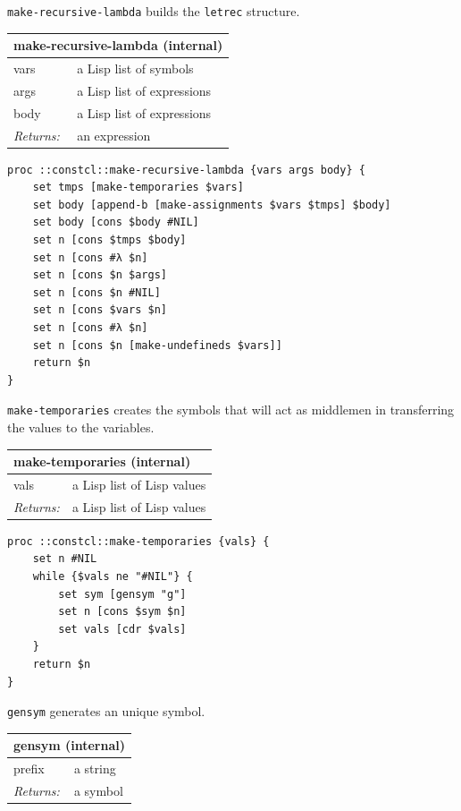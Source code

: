 \documentclass[twoside,9pt]{report}
\begin{document}
\texttt{make-recursive-lambda} builds the \texttt{letrec} structure.

\begin{tabular}{ |l l| }
\hline
\multicolumn{2}{|l|}{make-recursive-lambda (internal)} \\
\hline
vars & a Lisp list of symbols \\
args & a Lisp list of expressions \\
body & a Lisp list of expressions \\
\textit{Returns:} & an expression \\
\hline
\end{tabular}

\noindent\makebox[\linewidth]{\rule{\linewidth}{0.4pt}}
\begin{lstlisting}
proc ::constcl::make-recursive-lambda {vars args body} {
    set tmps [make-temporaries $vars]
    set body [append-b [make-assignments $vars $tmps] $body]
    set body [cons $body #NIL]
    set n [cons $tmps $body]
    set n [cons #λ $n]
    set n [cons $n $args]
    set n [cons $n #NIL]
    set n [cons $vars $n]
    set n [cons #λ $n]
    set n [cons $n [make-undefineds $vars]]
    return $n
}
\end{lstlisting}
\noindent\makebox[\linewidth]{\rule{\linewidth}{0.4pt}}

\texttt{make-temporaries} creates the symbols that will act as middlemen in transferring the values to the variables.

\begin{tabular}{ |l l| }
\hline
\multicolumn{2}{|l|}{make-temporaries (internal)} \\
\hline
vals & a Lisp list of Lisp values \\
\textit{Returns:} & a Lisp list of Lisp values \\
\hline
\end{tabular}

\noindent\makebox[\linewidth]{\rule{\linewidth}{0.4pt}}
\begin{lstlisting}
proc ::constcl::make-temporaries {vals} {
    set n #NIL
    while {$vals ne "#NIL"} {
        set sym [gensym "g"]
        set n [cons $sym $n]
        set vals [cdr $vals]
    }
    return $n
}
\end{lstlisting}
\noindent\makebox[\linewidth]{\rule{\linewidth}{0.4pt}}

\texttt{gensym} generates an unique symbol.

\begin{tabular}{ |l l| }
\hline
\multicolumn{2}{|l|}{gensym (internal)} \\
\hline
prefix & a string \\
\textit{Returns:} & a symbol \\
\hline
\end{tabular}
\end{document}
